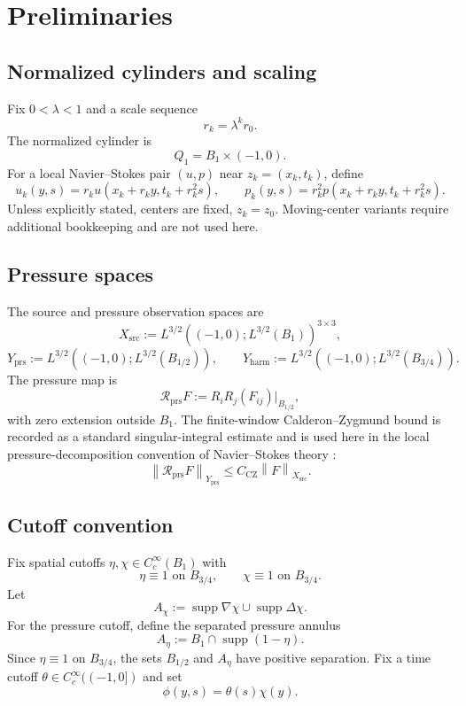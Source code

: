 \documentclass[11pt]{article}
\numberwithin{equation}{section}
\theoremstyle{plain}
\theoremstyle{definition}
\theoremstyle{remark}
\newcommand{\prs}{\mathrm{prs}}
\newcommand{\harm}{\mathrm{harm}}
\newcommand{\Rprs}{\mathcal R_{\prs}}
\newcommand{\norm}[1]{\left\lVert #1\right\rVert}
\begin{document}
\section{Preliminaries}
\label{sec:preliminaries}

\subsection{Normalized cylinders and scaling}

Fix \(0<\lambda<1\) and a scale sequence
\[
  r_k=\lambda^k r_0.
\]
The normalized cylinder is
\[
  Q_1=B_1\times(-1,0).
\]
For a local Navier--Stokes pair \((u,p)\) near \(z_k=(x_k,t_k)\), define
\[
  u_k(y,s)=r_k u(x_k+r_ky,t_k+r_k^2s),
  \qquad
  p_k(y,s)=r_k^2p(x_k+r_ky,t_k+r_k^2s).
\]
Unless explicitly stated, centers are fixed, \(z_k=z_0\).  Moving-center
variants require additional bookkeeping and are not used here.

\subsection{Pressure spaces}

The source and pressure observation spaces are
\[
  X_{\mathrm{src}}
  :=
  L^{3/2}((-1,0);L^{3/2}(B_1))^{3\times 3},
\]
\[
  Y_{\prs}
  :=
  L^{3/2}((-1,0);L^{3/2}(B_{1/2})),
  \qquad
  Y_{\harm}
  :=
  L^{3/2}((-1,0);L^{3/2}(B_{3/4})).
\]
The pressure map is
\[
  \Rprs F
  :=
  R_iR_j(F_{ij})\big|_{B_{1/2}},
\]
with zero extension outside \(B_1\).  The finite-window Calderon--Zygmund
bound is recorded as a standard singular-integral estimate and is used here in the local pressure-decomposition convention of Navier--Stokes theory \cite{SohrWahl1986,SereginLectureNotes}:
\begin{equation}\label{eq:cz-bound}
  \norm{\Rprs F}_{Y_{\prs}}
  \le C_{\mathrm{CZ}}\norm{F}_{X_{\mathrm{src}}}.
\end{equation}

\subsection{Cutoff convention}

Fix spatial cutoffs \(\eta,\chi\in C_c^\infty(B_1)\) with
\[
  \eta\equiv1\text{ on }B_{3/4},
  \qquad
  \chi\equiv1\text{ on }B_{3/4}.
\]
Let
\[
  A_\chi:=\operatorname{supp}\nabla\chi\cup\operatorname{supp}\Delta\chi.
\]
For the pressure cutoff, define the separated pressure annulus
\[
  A_\eta:=B_1\cap\operatorname{supp}(1-\eta).
\]
Since \(\eta\equiv1\) on \(B_{3/4}\), the sets \(B_{1/2}\) and \(A_\eta\)
have positive separation.
Fix a time cutoff \(\theta\in C_c^\infty((-1,0])\) and set
\[
  \phi(y,s)=\theta(s)\chi(y).
\]
\end{document}
